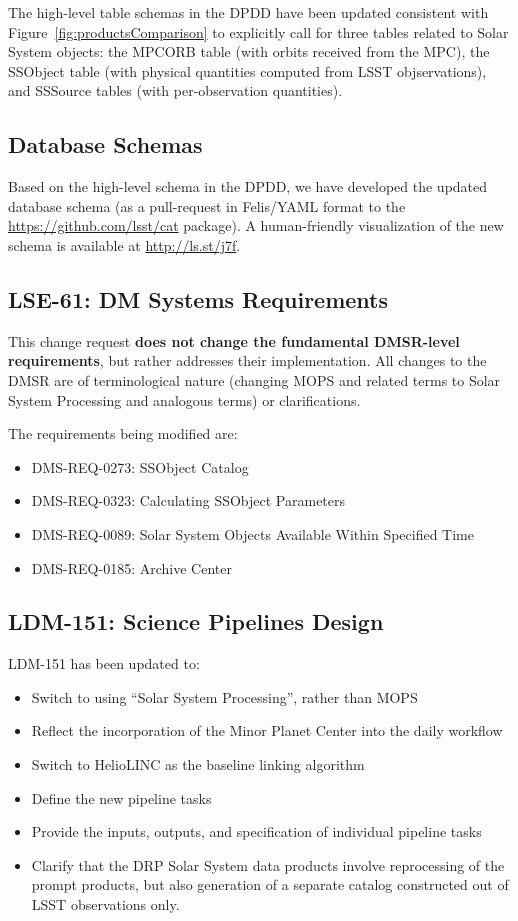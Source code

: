 \documentclass[DM,authoryear,toc,lsstdraft]{lsstdoc}
\begin{document}
The high-level table schemas in the DPDD have been updated consistent with Figure~\ref{fig:productsComparison} to explicitly call for three tables related to Solar System objects: the MPCORB table (with orbits received from the MPC), the SSObject table (with physical quantities computed from LSST objservations), and SSSource tables (with per-observation quantities).

\subsection{Database Schemas}

Based on the high-level schema in the DPDD, we have developed the updated database schema (as a pull-request in Felis/YAML format to the \url{https://github.com/lsst/cat} package). A human-friendly visualization of the new schema is available at \url{http://ls.st/j7f}.

\subsection{LSE-61: DM Systems Requirements}

This change request {\bf does not change the fundamental DMSR-level requirements}, but rather addresses their implementation. All changes to the DMSR are of terminological nature (changing MOPS and related terms to Solar System Processing and analogous terms) or clarifications.

The requirements being modified are:
\begin{itemize}
	\item DMS-REQ-0273: SSObject Catalog
	\item DMS-REQ-0323: Calculating SSObject Parameters
	\item DMS-REQ-0089: Solar System Objects Available Within Specified Time
	\item DMS-REQ-0185: Archive Center
\end{itemize}

\subsection{LDM-151: Science Pipelines Design}

LDM-151 has been updated to:
%
\begin{itemize}
	\item Switch to using ``Solar System Processing'', rather than MOPS
	\item Reflect the incorporation of the Minor Planet Center into the daily workflow
	\item Switch to HelioLINC as the baseline linking algorithm
	\item Define the new pipeline tasks
	\item Provide the inputs, outputs, and specification of individual pipeline tasks
	\item Clarify that the DRP Solar System data products involve reprocessing of the prompt products, but also generation of a separate catalog constructed out of LSST observations only.
\end{itemize}
\end{document}
